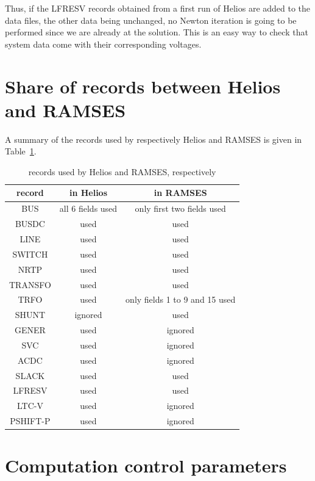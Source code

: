 Thus, if the LFRESV records obtained from a first run of Helios are added to the data files, the other data being unchanged, no Newton iteration is going to be performed since we are already at the solution. This is an easy way to check that system data come with their corresponding voltages.


\section{Share of records between Helios and RAMSES}

A summary of the records used by respectively Helios and RAMSES is given in Table~\ref{tab-records}.

\begin{table}[h!]
\centering
\caption{records used by Helios and RAMSES, respectively}\label{tab-records}
\begin{tabular}{|c|c|c|}
\hline
record & in Helios & in RAMSES \\ \hline \hline
BUS & all 6 fields used & only first two fields used \\ \hline
BUSDC & used & used \\ \hline
LINE & used & used \\ \hline
SWITCH & used & used \\ \hline
NRTP & used & used \\ \hline
TRANSFO & used & used \\ \hline
TRFO & used & only fields 1 to 9 and 15 used \\ \hline
SHUNT & ignored & used \\ \hline
GENER &  used & ignored \\ \hline
SVC & used & ignored \\ \hline
ACDC & used & ignored \\ \hline
SLACK & used & used \\ \hline
LFRESV & used & used \\ \hline
LTC-V & used & ignored \\ \hline
PSHIFT-P & used & ignored \\ \hline
\end{tabular}
\end{table}


\section{Computation control parameters}\label{sec-helios-ctl}

